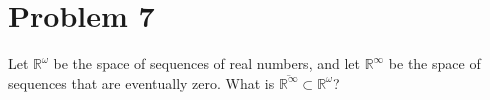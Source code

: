 \documentclass[fontsize=11pt]{scrartcl} %
\numberwithin{equation}{section} %
\numberwithin{figure}{section} %
\numberwithin{table}{section} %
\newcommand{\R}{\mathbb{R}}
\begin{document}
\section*{Problem 7}
Let $\R^{\omega}$ be the space of sequences of real numbers, and let $\R^{\infty}$ be
the space of sequences that are eventually zero. What is $\overline{\R^{\infty}}\subset\R^{\omega}$?


\end{document}
